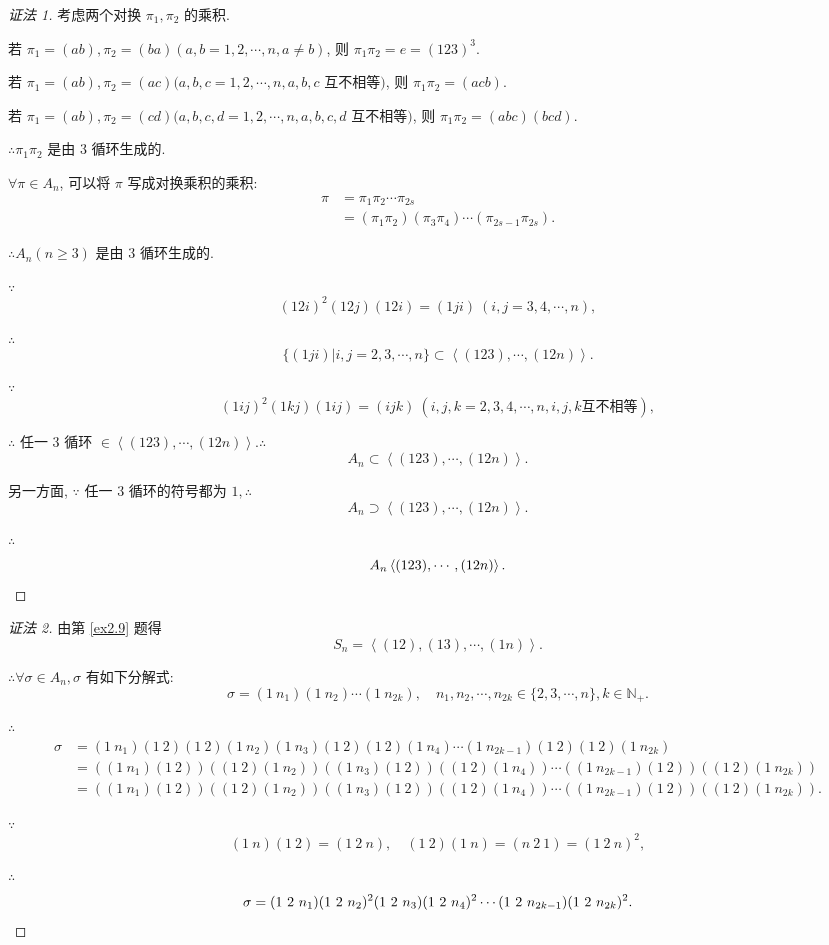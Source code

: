 \documentclass[color=black,device=normal,lang=cn,mode=geye]{elegantnote}
\begin{document}
\begin{proof}[证法 1]
    考虑两个对换 $\pi_1,\pi_2$ 的乘积.

    若 $\pi_1=(ab),\pi_2=(ba)(a,b=1,2,\cdots,n,a\neq b)$, 则 $\pi_1\pi_2=e=(123)^3$.

    若 $\pi_1=(ab),\pi_2=(ac)(a,b,c=1,2,\cdots,n,a,b,c$ 互不相等$)$, 则 $\pi_1\pi_2=(acb)$.

    若 $\pi_1=(ab),\pi_2=(cd)(a,b,c,d=1,2,\cdots,n,a,b,c,d$ 互不相等$)$, 则 $\pi_1\pi_2=(abc)(bcd)$.

    $\therefore\pi_1\pi_2$ 是由 $3$ 循环生成的.

    $\forall\pi\in A_n$, 可以将 $\pi$ 写成对换乘积的乘积:
    \begin{align*}
        \pi & =\pi_1\pi_2\cdots\pi_{2s} \\
        & =(\pi_1\pi_2)(\pi_3\pi_4)\cdots(\pi_{2s-1}\pi_{2s}).
    \end{align*}

    $\therefore A_n(n\geq3)$ 是由 $3$ 循环生成的.

    $\because$
    \[(12i)^2(12j)(12i)=(1ji)\ (i,j=3,4,\cdots,n),\]

    $\therefore$
    \[\{(1ji)|i,j=2,3,\cdots,n\}\subset\left<(123),\cdots,(12n)\right>.\]

    $\because$
    \[(1ij)^2(1kj)(1ij)=(ijk)\ (i,j,k=2,3,4,\cdots,n,i,j,k \text{互不相等}),\]

    $\therefore$ 任一 $3$ 循环 $\in\left<(123),\cdots,(12n)\right>.\therefore$
    \[A_n\subset\left<(123),\cdots,(12n)\right>.\]

    另一方面, $\because$ 任一 $3$ 循环的符号都为 $1,\therefore$
    \[A_n\supset\left<(123),\cdots,(12n)\right>.\]

    $\therefore$
    \[A_n\left<(123),\cdots,(12n)\right>.\qedhere\]
\end{proof}
\begin{proof}[证法 2]
    由第 \ref{ex2.9} 题得
    \[S_n=\left<(12),(13),\cdots,(1n)\right>.\]

    $\therefore\forall\sigma\in A_n,\sigma$ 有如下分解式:
    \[\sigma=(1\ n_1)(1\ n_2)\cdots(1\ n_{2k}),\quad n_1,n_2,\cdots,n_{2k}\in\{2,3,\cdots,n\},k\in\mathbb{N}_+.\]

    $\therefore$
    \begin{align*}
        \sigma & =(1\ n_1)(1\ 2)(1\ 2)(1\ n_2)(1\ n_3)(1\ 2)(1\ 2)(1\ n_4)\cdots(1\ n_{2k-1})(1\ 2)(1\ 2)(1\ n_{2k}) \\
        & =((1\ n_1)(1\ 2))((1\ 2)(1\ n_2))((1\ n_3)(1\ 2))((1\ 2)(1\ n_4))\cdots((1\ n_{2k-1})(1\ 2))((1\ 2)(1\ n_{2k})) \\
        & =((1\ n_1)(1\ 2))((1\ 2)(1\ n_2))((1\ n_3)(1\ 2))((1\ 2)(1\ n_4))\cdots((1\ n_{2k-1})(1\ 2))((1\ 2)(1\ n_{2k})).
    \end{align*}

    $\because$
    \[(1\ n)(1\ 2)=(1\ 2\ n),\quad(1\ 2)(1\ n)=(n\ 2\ 1)=(1\ 2\ n)^2,\]

    $\therefore$
    \[\sigma=(1\ 2\ n_1)(1\ 2\ n_2)^2(1\ 2\ n_3)(1\ 2\ n_4)^2\cdots(1\ 2\ n_{2k-1})(1\ 2\ n_{2k})^2.\qedhere\]
\end{proof}
\end{document}
